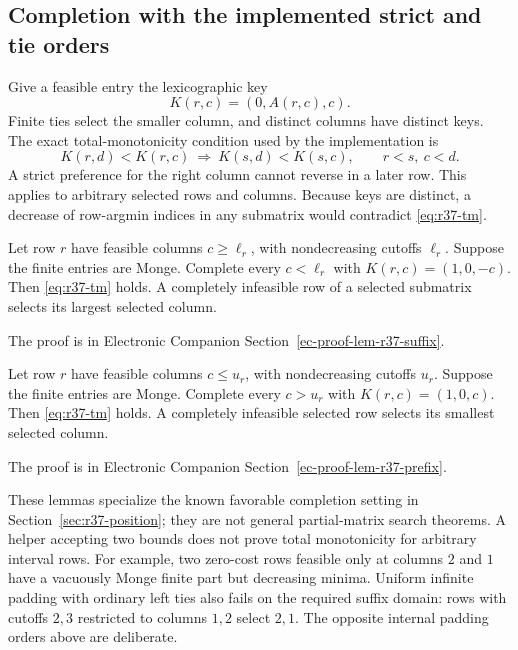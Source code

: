 \subsection{Completion with the implemented strict and tie orders}
Give a feasible entry the lexicographic key
\begin{equation}\label{eq:r37-finite-key}
 K(r,c)=(0,A(r,c),c).
\end{equation}
Finite ties select the smaller column, and distinct columns have distinct keys. The exact total-monotonicity condition used by the implementation is
\begin{equation}\label{eq:r37-tm}
 K(r,d)<K(r,c)\ \Longrightarrow\ K(s,d)<K(s,c),\qquad r<s,\ c<d.
\end{equation}
A strict preference for the right column cannot reverse in a later row. This applies to arbitrary selected rows and columns. Because keys are distinct, a decrease of row-argmin indices in any submatrix would contradict \eqref{eq:r37-tm}.

\begin{lemma}\label{lem:r37-suffix}
Let row $r$ have feasible columns $c\geq\ell_r$, with nondecreasing cutoffs $\ell_r$. Suppose the finite entries are Monge. Complete every $c<\ell_r$ with $K(r,c)=(1,0,-c)$. Then \eqref{eq:r37-tm} holds. A completely infeasible row of a selected submatrix selects its largest selected column.
\end{lemma}
\noindent The proof is in Electronic Companion Section~\ref{ec-proof-lem-r37-suffix}.


\begin{lemma}\label{lem:r37-prefix}
Let row $r$ have feasible columns $c\leq u_r$, with nondecreasing cutoffs $u_r$. Suppose the finite entries are Monge. Complete every $c>u_r$ with $K(r,c)=(1,0,c)$. Then \eqref{eq:r37-tm} holds. A completely infeasible selected row selects its smallest selected column.
\end{lemma}
\noindent The proof is in Electronic Companion Section~\ref{ec-proof-lem-r37-prefix}.


These lemmas specialize the known favorable completion setting in Section~\ref{sec:r37-position}; they are not general partial-matrix search theorems. A helper accepting two bounds does not prove total monotonicity for arbitrary interval rows. For example, two zero-cost rows feasible only at columns $2$ and $1$ have a vacuously Monge finite part but decreasing minima. Uniform infinite padding with ordinary left ties also fails on the required suffix domain: rows with cutoffs $2,3$ restricted to columns $1,2$ select $2,1$. The opposite internal padding orders above are deliberate.

